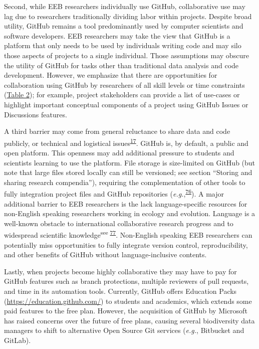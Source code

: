 Second, while EEB researchers individually use GitHub, collaborative use may lag due to researchers traditionally dividing labor within projects.
Despite broad utility, GitHub remains a tool predominantly used by computer scientists and software developers.
EEB researchers may take the view that GitHub is a platform that only needs to be used by individuals writing code and may silo those aspects of projects to a single individual.
Those assumptions may obscure the utility of GitHub for tasks other than traditional data analysis and code development.
However, we emphasize that there are opportunities for collaboration using GitHub by researchers of all skill levels or time constraints (\protect\hyperlink{tbl:roles}{Table 2}); for example, project stakeholders can provide a list of use-cases or highlight important conceptual components of a project using GitHub Issues or Discussions features.

A third barrier may come from general reluctance to share data and code publicly, or technical and logistical issues\textsuperscript{\protect\hyperlink{ref-pq2Tv1BC}{17}}.
GitHub is, by default, a public and open platform.
This openness may add additional pressure to students and scientists learning to use the platform.
File storage is size-limited on GitHub (but note that large files stored locally can still be versioned; see section ``Storing and sharing research compendia''), requiring the complementation of other tools to fully integration project files and GitHub repositories (\emph{e.g.},\textsuperscript{\protect\hyperlink{ref-lx49NGto}{76}}).
A major additional barrier to EEB researchers is the lack language-specific resources for non-English speaking researchers working in ecology and evolution.
Language is a well-known obstacle to international collaborative research progress and to widespread scientific knowledge\textsuperscript{see \protect\hyperlink{ref-cW7vGddM}{77}}.
Non-English speaking EEB researchers can potentially miss opportunities to fully integrate version control, reproducibility, and other benefits of GitHub without language-inclusive contents.

Lastly, when projects become highly collaborative they may have to pay for GitHub features such as branch protections, multiple reviewers of pull requests, and time in its automation tools.
Currently, GitHub offers Education Packs (\url{https://education.github.com/}) to students and academics, which extends some paid features to the free plan.
However, the acquisition of GitHub by Microsoft has raised concerns over the future of free plans, causing several biodiversity data managers to shift to alternative Open Source Git services (\emph{e.g.}, Bitbucket and GitLab).

